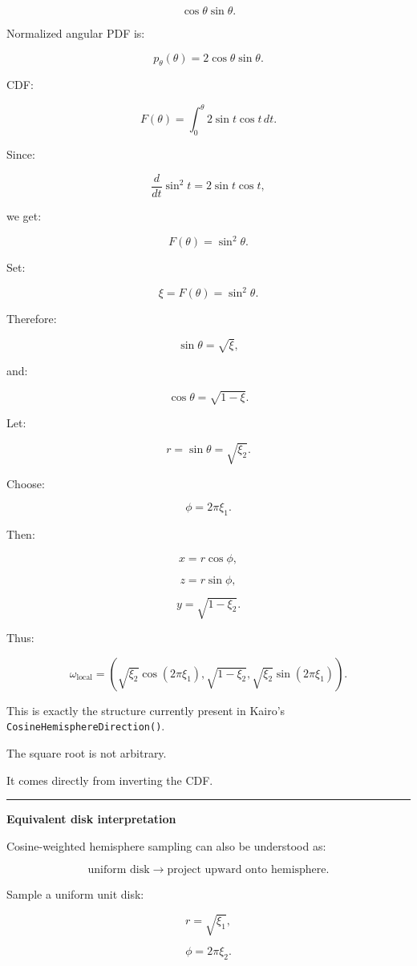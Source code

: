 \[
\cos\theta\sin\theta.
\]

Normalized angular PDF is:

\[
p_\theta(\theta)
=
2\cos\theta\sin\theta.
\]

CDF:

\[
F(\theta)
=
\int_0^\theta
2\sin t\cos t\,dt.
\]

Since:

\[
\frac{d}{dt}\sin^2t
=
2\sin t\cos t,
\]

we get:

\[
\boxed{
F(\theta)
=
\sin^2\theta.
}
\]

Set:

\[
\xi=F(\theta)
=
\sin^2\theta.
\]

Therefore:

\[
\sin\theta
=
\sqrt{\xi},
\]

and:

\[
\cos\theta
=
\sqrt{1-\xi}.
\]

Let:

\[
r=\sin\theta=\sqrt{\xi_2}.
\]

Choose:

\[
\phi=2\pi\xi_1.
\]

Then:

\[
x=r\cos\phi,
\]

\[
z=r\sin\phi,
\]

\[
y=\sqrt{1-\xi_2}.
\]

Thus:

\[
\boxed{
\omega_{\text{local}}
=
\left(
\sqrt{\xi_2}\cos(2\pi\xi_1),
\sqrt{1-\xi_2},
\sqrt{\xi_2}\sin(2\pi\xi_1)
\right).
}
\]

This is exactly the structure currently present in Kairo's \texttt{CosineHemisphereDirection()}.

The square root is not arbitrary.

It comes directly from inverting the CDF.

\begin{center}\rule{0.5\linewidth}{0.5pt}\end{center}

\textbf{Equivalent disk interpretation}

Cosine-weighted hemisphere sampling can also be understood as:

\[
\text{uniform disk}
\rightarrow
\text{project upward onto hemisphere}.
\]

Sample a uniform unit disk:

\[
r=\sqrt{\xi_1},
\]

\[
\phi=2\pi\xi_2.
\]

